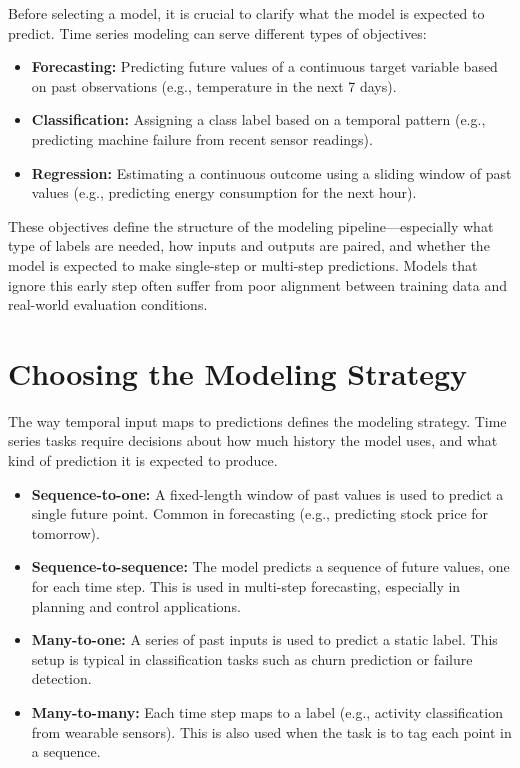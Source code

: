 \documentclass[12pt,openany, draft]{book}
\begin{document}
Before selecting a model, it is crucial to clarify what the model is expected to predict. Time series modeling can serve different types of objectives:

\begin{itemize}
    \item \textbf{Forecasting:} Predicting future values of a continuous target variable based on past observations (e.g., temperature in the next 7 days).
    \item \textbf{Classification:} Assigning a class label based on a temporal pattern (e.g., predicting machine failure from recent sensor readings).
    \item \textbf{Regression:} Estimating a continuous outcome using a sliding window of past values (e.g., predicting energy consumption for the next hour).
\end{itemize}

These objectives define the structure of the modeling pipeline—especially what type of labels are needed, how inputs and outputs are paired, and whether the model is expected to make single-step or multi-step predictions. Models that ignore this early step often suffer from poor alignment between training data and real-world evaluation conditions.


\section{Choosing the Modeling Strategy}

The way temporal input maps to predictions defines the modeling strategy. Time series tasks require decisions about how much history the model uses, and what kind of prediction it is expected to produce.

\begin{itemize}
    \item \textbf{Sequence-to-one:} A fixed-length window of past values is used to predict a single future point. Common in forecasting (e.g., predicting stock price for tomorrow).
    
    \item \textbf{Sequence-to-sequence:} The model predicts a sequence of future values, one for each time step. This is used in multi-step forecasting, especially in planning and control applications.

    \item \textbf{Many-to-one:} A series of past inputs is used to predict a static label. This setup is typical in classification tasks such as churn prediction or failure detection.

    \item \textbf{Many-to-many:} Each time step maps to a label (e.g., activity classification from wearable sensors). This is also used when the task is to tag each point in a sequence.
\end{itemize}
\end{document}
